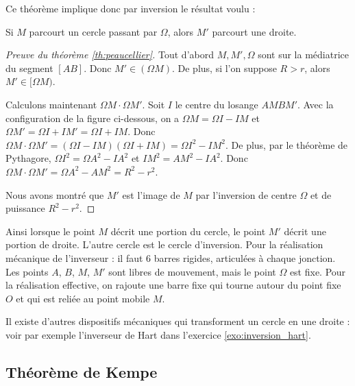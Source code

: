 \documentclass[11pt,class=report,crop=false]{standalone}
\begin{document}
Ce théorème implique donc par inversion le résultat voulu :
\begin{corollaire}
Si $M$ parcourt un cercle passant par $\Omega$, alors
$M'$ parcourt une droite.
\end{corollaire}



\begin{proof}[Preuve du théorème \ref{th:peaucellier}]
Tout d'abord $M,M',\Omega$ sont sur la médiatrice du segment $[AB]$.
Donc $M' \in (\Omega M)$. De plus, si l'on suppose $R>r$, alors
$M' \in [\Omega M)$.

Calculons maintenant $\Omega M \cdot \Omega M'$.
Soit $I$ le centre du losange $AMBM'$.
Avec la configuration de la figure ci-dessous, on a $\Omega M= \Omega I - IM$ et $\Omega M' = \Omega I + IM'= \Omega I + IM$.
Donc $\Omega M \cdot \Omega M' = (\Omega I - IM) (\Omega I + IM) = \Omega I ^2 - IM^2.$
De plus, par le théorème de Pythagore, $\Omega I^2 = \Omega A^2 - IA^2$ et 
$IM^2 = AM^2 - IA^2$. Donc $\Omega M\cdot \Omega M'= \Omega A^2 - AM^2 = R^2 - r^2$.


Nous avons montré que $M'$ est l'image de $M$ par l'inversion de centre $\Omega$
et de puissance $R^2 - r^2$.
\end{proof}

Ainsi lorsque le point $M$ décrit une portion du cercle, 
le point $M'$ décrit une portion de droite. L'autre cercle est le cercle d'inversion.
Pour la réalisation mécanique de l'inverseur : il faut $6$ barres rigides, articulées à chaque jonction. Les points $A$, $B$, $M$, $M'$ sont libres de mouvement, mais le point $\Omega$ est fixe. Pour la réalisation effective, on rajoute une barre fixe qui tourne autour du point fixe $O$ et qui est reliée au point mobile $M$.


Il existe d'autres dispositifs mécaniques qui transforment
un cercle en une droite : voir par exemple l'inverseur de Hart
dans l'exercice \ref{exo:inversion_hart}.

\subsection{Théorème de Kempe}
\end{document}
